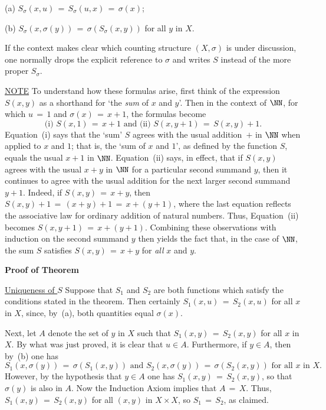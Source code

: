         (a) $S_{{\sigma}}(x,u) \,=\, S_{{\sigma}}(u,x) \,=\, {\sigma}(x)$;

        (b) $S_{{\sigma}}(x,{\sigma}(y)) \,=\, {\sigma}(S_{{\sigma}}(x,y))$ for all $y$ in $X$.

\noindent If the context makes clear which counting structure $(X,{\sigma})$ is under discussion,
    one normally drops the explicit reference to ${\sigma}$ and writes $S$ instead of the more proper $S_{{\sigma}}$.

\V

        \underline{NOTE} To understand how these formulas arise, first think of the expression $S(x,y)$ as a shorthand for `the {\em sum} of $x$ and $y$'.
    Then in the context of  ${\NN}$, for which $u \,=\, 1$ and ${\sigma}(x) \,=\, x+1$, the formulas become
        \begin{displaymath}
        \mbox{(i) } S(x,1) \,=\, x+1 \mbox{ and } \mbox{(ii) } S(x,y+1) \,=\, S(x,y)+1.
        \end{displaymath}
    Equation~(i) says that the `sum' $S$ agrees with the usual addition~$+$ in ${\NN}$ when applied to $x$ and $1$;
    that is, the `sum of $x$ and $1$', as defined by the function $S$, equals the usual $x+1$ in ${\NN}$.
    Equation~(ii) says, in effect, that if $S(x,y)$ agrees with the usual $x+y$ in ${\NN}$ for a particular second summand $y$,
    then it continues to agree with the usual addition for the next larger second summand $y+1$.
    Indeed, if $S(x,y) \,=\, x+y$, then $S(x,y)+1 \,=\, (x+y)+1 \,=\, x+(y+1)$, where the last equation reflects the associative law for ordinary addition of  natural numbers.
    Thus, Equation~(ii) becomes $S(x,y+1) \,=\, x+(y+1)$. Combining these observations with induction on the second summand $y$ then yields the fact that, 
    in the case of ${\NN}$, the sum $S$ satisfies $S(x,y) \,=\, x+y$ for {\em all} $x$ and $y$.

\V

        {\bf Proof of Theorem}

\V

        \underline{Uniqueness of $S$} Suppose that $S_{1}$ and $S_{2}$ are both functions which satisfy the conditions stated in the theorem.
    Then certainly $S_{1}(x,u) \,=\, S_{2}(x,u)$ for all $x$ in $X$, since, by~(a), both quantities equal ${\sigma}(x)$.

        Next, let $A$ denote the set of $y$ in $X$ such that $S_{1}(x,y) \,=\, S_{2}(x,y)$ for all $x$ in $X$.
    By what was just proved, it is clear that $u{\in}A$.
    Furthermore, if $y{\in}A$, then by~(b) one has
        \begin{displaymath}
        S_{1}(x,{\sigma}(y)) \,=\, {\sigma}(S_{1}(x,y)) \mbox{ and }
        S_{2}(x,{\sigma}(y)) \,=\, {\sigma}(S_{2}(x,y)) \mbox{ for all $x$ in $X$}.
        \end{displaymath}
    However, by the hypothesis that $y{\in}A$ one has $S_{1}(x,y) \,=\, S_{2}(x,y)$, so that ${\sigma}(y)$  is also in $A$.
    Now the Induction Axiom implies that $A \,=\, X$.
    Thus, $S_{1}(x,y) \,=\, S_{2}(x,y)$ for all $(x,y)$ in $X{\times}X$, so $S_{1} \,=\, S_{2}$, as claimed.

